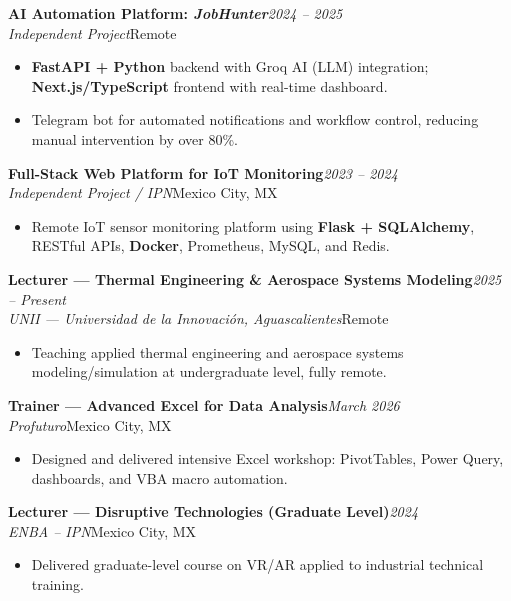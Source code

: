 \documentclass[10pt, letterpaper]{article}
\newcommand{\cventry}[4]{%
  \vspace{2pt}%
  {\color{azuloscuro}\textbf{#1}}\hfill{\small\color{gristexto}\textit{#2}}\\[-3pt]
  {\small\color{azulmedio}\textit{#3}}\hfill{\small\color{gristexto}#4}%
  \vspace{1pt}%
}
\begin{document}
\vspace{2pt}

\cventry{AI Automation Platform: \textit{JobHunter}}{2024 -- 2025}{Independent Project}{Remote}
\begin{itemize}
  \item \textbf{FastAPI + Python} backend with Groq AI (LLM) integration; \textbf{Next.js/TypeScript} frontend with real-time dashboard.
  \item Telegram bot for automated notifications and workflow control, reducing manual intervention by over 80\%.
\end{itemize}

\vspace{2pt}

\cventry{Full-Stack Web Platform for IoT Monitoring}{2023 -- 2024}{Independent Project / IPN}{Mexico City, MX}
\begin{itemize}
  \item Remote IoT sensor monitoring platform using \textbf{Flask + SQLAlchemy}, RESTful APIs, \textbf{Docker}, Prometheus, MySQL, and Redis.
\end{itemize}

\vspace{2pt}

\cventry{Lecturer --- Thermal Engineering \& Aerospace Systems Modeling}{2025 -- Present}{UNII --- Universidad de la Innovaci\'{o}n, Aguascalientes}{Remote}
\begin{itemize}
  \item Teaching applied thermal engineering and aerospace systems modeling/simulation at undergraduate level, fully remote.
\end{itemize}

\vspace{2pt}

\cventry{Trainer --- Advanced Excel for Data Analysis}{March 2026}{Profuturo}{Mexico City, MX}
\begin{itemize}
  \item Designed and delivered intensive Excel workshop: PivotTables, Power Query, dashboards, and VBA macro automation.
\end{itemize}

\vspace{2pt}

\cventry{Lecturer --- Disruptive Technologies (Graduate Level)}{2024}{ENBA -- IPN}{Mexico City, MX}
\begin{itemize}
  \item Delivered graduate-level course on VR/AR applied to industrial technical training.
\end{itemize}
\end{document}
